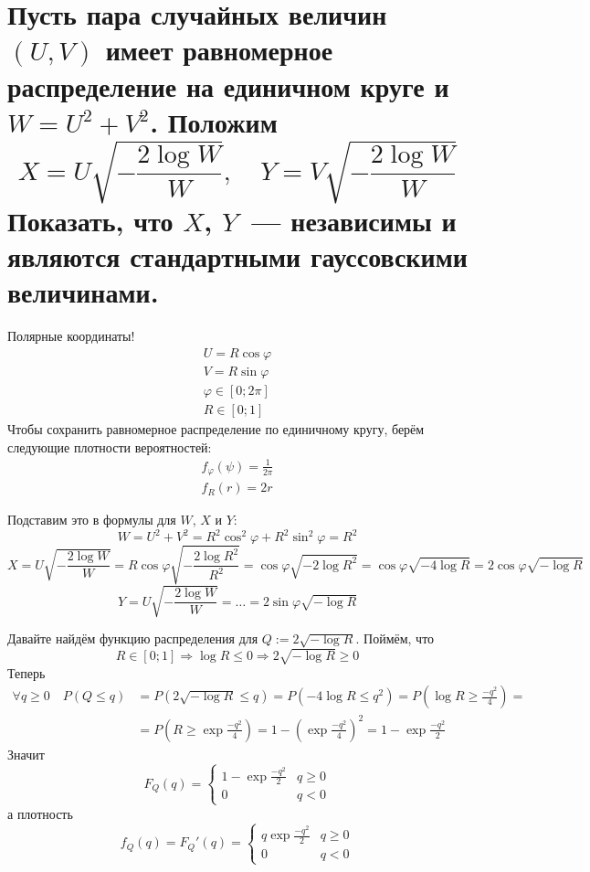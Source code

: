 \documentclass{report}
\renewcommand{\phi}{\varphi}
\begin{document}
\chapter{
Пусть пара случайных величин $(U, V)$ имеет равномерное распределение на единичном круге и $W = U^2 + V^2$.
Положим
\[
    X=U\sqrt{-\frac{2\log W}{W}},\quad
    Y=V\sqrt{-\frac{2\log W}{W}}
\]
Показать, что $X$, $Y$~--- независимы и являются стандартными гауссовскими величинами.
}

Полярные координаты!
\begin{gather*}
    U=R\cos\phi\\
    V=R\sin\phi\\
    \phi\in\left[0;2\pi\right]\\
    R\in\left[0;1\right]
\end{gather*}
Чтобы сохранить равномерное распределение по единичному кругу, берём следующие плотности вероятностей:
\begin{gather*}
    f_\phi(\psi)=\frac{1}{2\pi}\\
    f_R(r)=2r
\end{gather*}

Подставим это в формулы для $W$, $X$ и $Y$:
\[ W=U^2+V^2=R^2\cos^2\phi+R^2\sin^2\phi=R^2 \]
\[ X=U\sqrt{-\frac{2\log W}{W}}=
R\cos\phi\sqrt{-\frac{2\log R^2}{R^2}}=
\cos\phi\sqrt{-2\log R^2}=
\cos\phi\sqrt{-4\log R}=
2\cos\phi\sqrt{-\log R} \]
\[
 Y=U\sqrt{-\frac{2\log W}{W}}=\dots=2\sin\phi\sqrt{-\log R}
\]

Давайте найдём функцию распределения для $Q:=2\sqrt{-\log R}$.
Поймём, что
\[
    R\in\left[0;1\right] \Rightarrow \log R \le 0 \Rightarrow 2\sqrt{-\log R} \ge 0
\]
Теперь
\[
\begin{aligned}
\forall q\ge 0 \quad
P\left(Q\le q\right)&=
P\left(2\sqrt{-\log R} \le q\right)=
P\left(-4\log R \le q^2\right)=
P\left(\log R \ge \frac{-q^2}{4}\right)=
\\&=
P\left(R \ge \exp{\frac{-q^2}{4}}\right)=
1-\left(\exp{\frac{-q^2}{4}}\right)^2=
1-\exp{\frac{-q^2}{2}}
\end{aligned}
\]
Значит
\[
 F_Q(q)=
 \begin{cases}
  1-\exp{\frac{-q^2}{2}} &q\ge 0 \\
  0 &q<0
 \end{cases}
\]
а плотность
\[
f_Q(q)=F_Q'(q)=
 \begin{cases}
  q\exp{\frac{-q^2}{2}} &q\ge 0 \\
  0 &q<0
 \end{cases}
\]
\end{document}
